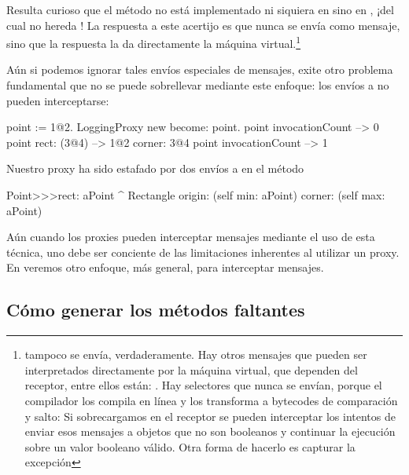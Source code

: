 \documentclass[a4paper,10pt,twoside]{book}
\begin{document}
Resulta curioso que el método  no está implementado ni
siquiera en  sino en , ¡del cual no hereda
!  La respuesta a este acertijo es que 
nunca se envía como mensaje, sino que la respuesta la da directamente
la máquina virtual.\footnote{ tampoco se envía,
  verdaderamente.  Hay otros mensajes que pueden ser interpretados
  directamente por la máquina virtual, que dependen del receptor,
  entre ellos están:
\ct{+- < > <= >= = ~= * / \ ==}
.
Hay selectores que nunca se envían, porque el compilador los compila
en l\'inea y los transforma a bytecodes de comparación y salto:
Si sobrecargamos  en el receptor se pueden
interceptar los intentos de enviar esos mensajes a objetos que no son
booleanos y continuar la ejecución sobre un valor booleano válido.
Otra forma de hacerlo es capturar la excepción
}%

Aún si podemos ignorar tales envíos especiales de mensajes, exite otro
problema fundamental que no se puede sobrellevar mediante este
enfoque:  los envíos a \self no pueden interceptarse:
\begin{code}{}
point := 1@2.
LoggingProxy new become: point.
point invocationCount --> 0
point rect: (3@4)        --> 1@2 corner: 3@4
point invocationCount --> 1
\end{code}

Nuestro proxy ha sido estafado por dos envíos a \self en el
método 
\begin{code}{}
Point>>>rect: aPoint
        ^ Rectangle  origin: (self min: aPoint) corner: (self max: aPoint)
\end{code}

Aún cuando los proxies pueden interceptar mensajes mediante el uso de
esta técnica, uno debe ser conciente de las limitaciones inherentes al
utilizar un proxy.  En  veremos otro enfoque, más
general, para interceptar mensajes.

\subsection{Cómo generar los métodos faltantes}
\end{document}
